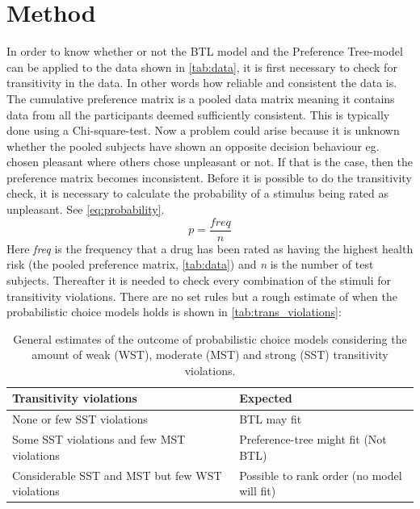 \section*{Method}
\label{Method}
%
In order to know whether or not the BTL model and the Preference Tree-model can be applied to the data shown in \autoref{tab:data}, it is first necessary to check for transitivity in the data. In other words how reliable and consistent the data is. The cumulative preference matrix is a pooled data matrix meaning it contains data from all the participants deemed sufficiently consistent. This is typically done using a Chi-square-test. Now a problem could arise because it is unknown whether the pooled subjects have shown an opposite decision behaviour eg. chosen pleasant where others chose unpleasant or not. If that is the case, then the preference matrix becomes inconsistent. Before it is possible to do the transitivity check, it is necessary to calculate the probability of a stimulus being rated as unpleasant. See \autoref{eq:probability}.
%
\begin{equation}
p = \frac{freq}{n}
\label{eq:probability}
\end{equation}
\noindent
%
Here \textit{freq} is the frequency that a drug has been rated as having the highest health risk (the pooled preference matrix, \autoref{tab:data}) and \textit{n} is the number of test subjects. Thereafter it is needed to check every combination of the stimuli for transitivity violations. There are no set rules but a rough estimate of when the probabilistic choice models holds is shown in \autoref{tab:trans_violations}:
%
\begin{table}[H]
\centering
\begin{tabular}{@{}ll@{}}
\toprule
Transitivity violations                                    & Expected                                      \\ \midrule
None or few SST violations                                 & BTL may fit                                   \\
Some SST violations and few MST violations                 & Preference-tree might fit (Not BTL)            \\
Considerable SST and MST but few WST violations & Possible to rank order (no model will fit) \\ \bottomrule
\end{tabular}
\caption{General estimates of the outcome of probabilistic choice models considering the amount of weak (WST), moderate (MST) and strong (SST) transitivity violations.}
\label{tab:trans_violations}
\end{table}
